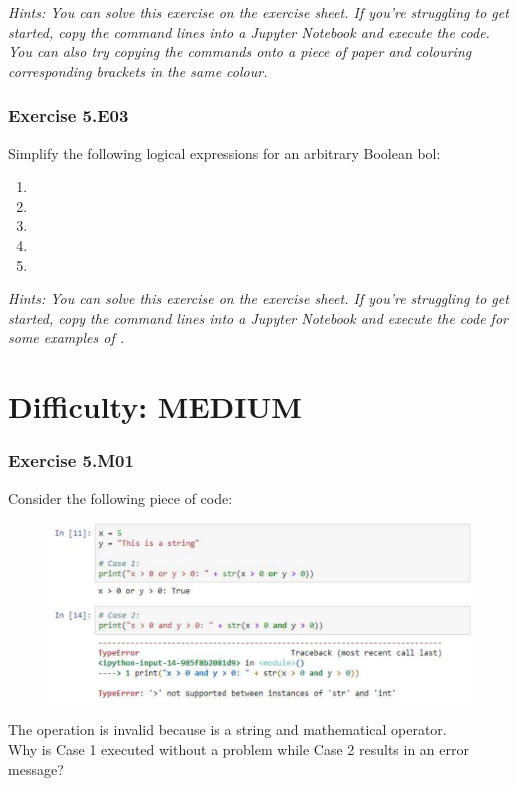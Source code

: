 \textit{Hints:
You can solve this exercise on the exercise sheet. If you’re struggling to get started, copy the command lines into a Jupyter Notebook and execute the code. You can also try copying the commands onto a piece of paper and colouring corresponding brackets in the same colour.}\\[1cm]



\subsubsection*{Exercise 5.E03}
Simplify the following logical expressions for an arbitrary Boolean bol:
\begin{enumerate}[label=(\alph*)]
	\item {}
	\item {}
	\item {}
	\item {}
	\item {}
\end{enumerate}

\textit{Hints:
You can solve this exercise on the exercise sheet. If you’re struggling to get started, copy the command lines into a Jupyter Notebook and execute the code for some examples of {}.}



\newpage
\section{Difficulty: MEDIUM}

\subsubsection*{Exercise 5.M01}
Consider the following piece of code:
\begin{figure}[H]
		\centering
		\includegraphics[width=\textwidth]{../IMG/5M01.png} 
\end{figure}
The operation {} is invalid because {} is a string and {} mathematical operator.\\
Why is Case 1 executed without a problem while Case 2 results in an error message?\\


